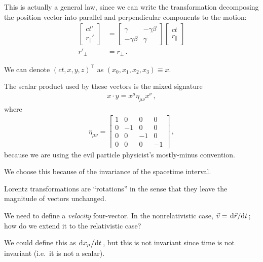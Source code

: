 \documentclass[main.tex]{subfiles}
\begin{document}
This is actually a general law, since we can write the transformation decomposing the position vector into parallel and perpendicular components to the motion: 
%
\begin{subequations}
\begin{align}
\left[\begin{array}{c}
ct' \\ 
r_{\parallel}'
\end{array}\right]
&=
\left[\begin{array}{cc}
\gamma  & -\gamma \beta  \\ 
-\gamma \beta  & \gamma 
\end{array}\right]
\left[\begin{array}{c}
ct \\ 
r_{\parallel}
\end{array}\right]  \\
r'_{\perp} &= r_{\perp}
\,.
\end{align}
\end{subequations}

We can denote \((ct, x, y, z)^{\top}\) as \((x_0, x_1, x_2, x_3 ) \equiv x\). 

The scalar product used by these vectors is the mixed signature 
%
\begin{align}
x \cdot y = x^{\mu } \eta_{\mu \nu } x^{\nu }
\,,
\end{align}
%
where
%
\begin{subequations}
\begin{align}
\eta_{\mu \nu } = \left[\begin{array}{cccc}
1 & 0 & 0 & 0 \\ 
0 & -1 & 0 & 0 \\ 
0 & 0 & -1 & 0 \\ 
0 & 0 & 0 & -1
\end{array}\right]
\,,
\end{align}
\end{subequations}
%
because we are using the evil particle physicist's mostly-minus convention.

We choose this because of the invariance of the spacetime interval. 

Lorentz transformations are ``rotations'' in the sense that they leave the magnitude of vectors unchanged. 

We need to define a \emph{velocity} four-vector.
In the nonrelativistic case, \(\vec{v} = \dv*{\vec{r}}{t}\); how do we extend it to the relativistic case?

We could define this as \(\dv*{x_{\mu }}{t}\), but this is not invariant since time is not invariant (i.e.\ it is not a scalar).
\end{document}
